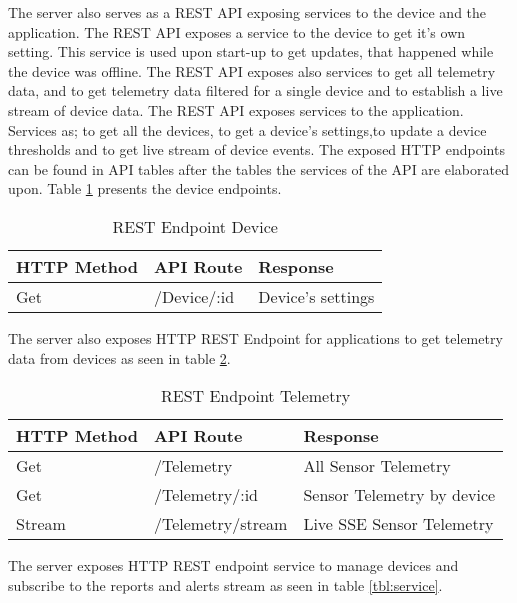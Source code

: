 The server also serves as a REST API exposing services to the device and the application. The REST API exposes a service to the device to get it's own setting. This service is used upon start-up to get updates, that happened while the device was offline. 
The REST API exposes also services to get all telemetry data, and to get telemetry data filtered for a single device and to establish a live stream of device data. 
The REST API exposes services to the application. Services as; to get all the devices, to get a device's settings,to update a device thresholds and to get live stream of device events. The exposed HTTP endpoints can be found in API tables after the tables the services of the API are elaborated upon. Table \ref{tbl:device} presents the device endpoints. 

\begin{table}[H]
    \centering
    \begin{tabular}{|l|l|l|}
    \hline
    \textbf{HTTP Method}    & \textbf{API Route} & \textbf{Response} \\ \hline
    Get & /Device/:id & Device's settings  \\ \hline
    \end{tabular}
    \caption{REST Endpoint Device}
    \label{tbl:device}
\end{table}
The server also exposes HTTP REST Endpoint for applications to get telemetry data from devices as seen in table \ref{tbl:telemetry}.

\begin{table}[H]
    \centering
    \begin{tabular}{|l|l|p{5cm}|}
    \hline
    \textbf{HTTP Method}    & \textbf{API Route} & \textbf{Response} \\ \hline
    Get & /Telemetry & All Sensor Telemetry  \\ \hline
    Get & /Telemetry/:id & Sensor Telemetry by device \\ \hline
    Stream & /Telemetry/stream & Live SSE Sensor Telemetry  \\ \hline
    \end{tabular}
    \caption{REST Endpoint Telemetry}
    \label{tbl:telemetry}
\end{table}
The server exposes HTTP REST endpoint service to manage devices and subscribe to the reports and alerts stream as seen in table \ref{tbl:service}.

